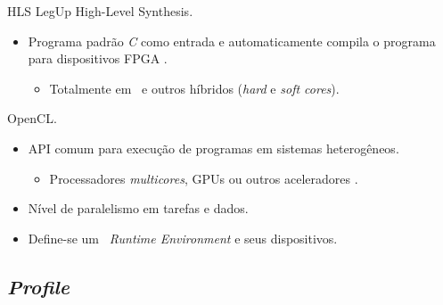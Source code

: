    \begin{frame}{HLS} \vspace{-1em}
      LegUp High-Level Synthesis.
      \begin{itemize}
         \setlength{\itemsep}{0.7em}
         \item Programa padrão \textit{C} como entrada e automaticamente compila o programa para dispositivos FPGA \cite{Canis2011}.
         \begin{itemize}
            \item Totalmente em \hardware\ e outros híbridos (\textit{hard} e \textit{soft cores}).
         \end{itemize}
      \end{itemize}
   
         \bigskip
         
      OpenCL.
      \begin{itemize}
         \setlength{\itemsep}{1.2em}
         \item API comum para execução de programas em sistemas heterogêneos.
         \begin{itemize}
            \item Processadores \textit{multicores}, GPUs ou outros aceleradores \cite{Shagrithaya2013, Czajkowski2012}. 
         \end{itemize}
         
         \item Nível de paralelismo em tarefas e dados. 
         
         \item Define-se um \core\ \textit{Runtime Environment} e seus dispositivos.
         
      \end{itemize}
   \end{frame}

   
   \subsection{{\it Profile}}

